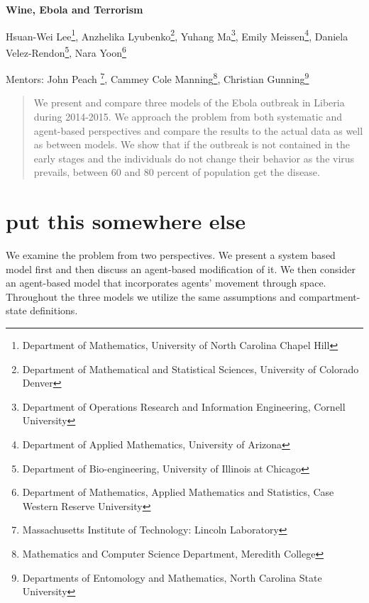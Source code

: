 \documentclass[10pt]{article}
\begin{document}
 

\centerline{\large \bf Wine, Ebola and Terrorism}

\vspace{.1truein}

\def\thefootnote{\arabic{footnote}}
\begin{center}
  Hsuan-Wei Lee\footnote{Department of Mathematics, University of North Carolina Chapel Hill},
  Anzhelika Lyubenko\footnote{Department of Mathematical and Statistical Sciences, University of Colorado Denver},
  Yuhang Ma\footnote{Department of Operations Research and Information Engineering, Cornell University},
  Emily Meissen\footnote{Department of Applied Mathematics, University of Arizona},
  Daniela Velez-Rendon\footnote{Department of Bio-engineering, University of Illinois at Chicago},
    Nara Yoon\footnote{
Department of Mathematics, Applied Mathematics and Statistics, Case Western Reserve University}
\end{center}


\begin{center}
Mentors: John Peach \footnote{Massachusetts Institute of Technology: Lincoln Laboratory}, Cammey Cole Manning\footnote{Mathematics and Computer Science Department, Meredith College},
Christian Gunning\footnote{Departments of Entomology and Mathematics, North Carolina State University}
\end{center}

\begin{abstract}
\noindent We present and compare three models of the Ebola outbreak in Liberia during 2014-2015. We approach the problem from both systematic and agent-based perspectives and compare the results to the actual data as well as between models. We show that if the outbreak is not contained in the early stages and the individuals do not change their behavior as the virus prevails, between 60 and 80 percent of population get the disease. 
\end{abstract}

\tableofcontents

\section{put this somewhere else}
We examine the problem from two perspectives. We present a system based model first and then discuss an agent-based modification of it. We then consider an agent-based model that incorporates agents' movement through space. Throughout the three models we utilize the same assumptions and compartment-state definitions. 
\end{document}
